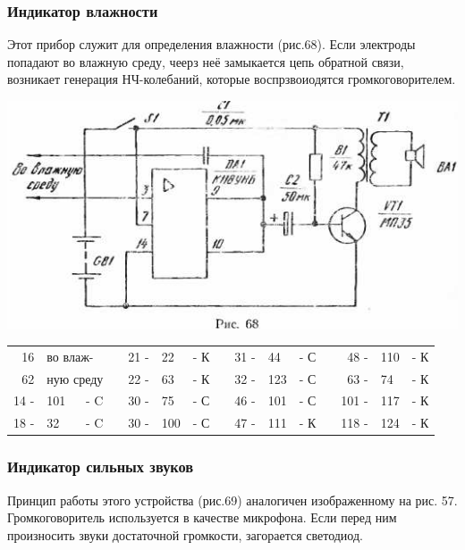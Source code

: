 \documentclass[12pt]{article}
\begin{document}
\newpage

\subsubsection{Индикатор влажности}

Этот прибор служит для определения влажности (рис.68). Если электроды попадают во влажную среду, чеерз неё замыкается цепь обратной связи, возникает генерация НЧ-колебаний, которые воспрзвоиодятся громкоговорителем.

\includegraphics[scale=1, angle=-0.5]{ekon3_068_1}

\hrulefill

\begin{tabular}{r l r p{0.5cm} r l r p{0.5cm} r l r p{0.5cm} r l r}
16   & \multicolumn{2}{l}{ во влаж-} &   & 21 - &  22 & - К &   &  31 - &  44 & - С &   &  48 - & 110  & - К\\
62   & \multicolumn{2}{l}{ную среду} &   & 22 - &  63 & - К &   &  32 - & 123 & - С &   &  63 - &  74  & - К\\
14 - & 101 & - C                     &   & 30 - &  75 & - С &   &  46 - & 101 & - С &   & 101 - & 117  & - К\\
18 - &  32 & - C                     &   & 30 - & 100 & - С &   &  47 - & 111 & - К &   & 118 - & 124  & - К\\
\end{tabular}

\hrulefill

\subsubsection{ Индикатор сильных звуков}

Принцип работы этого устройства (рис.69) аналогичен изображенному на рис. 57. Громкоговоритель используется в качестве микрофона. Если перед ним произносить звуки достаточной громкости, загорается светодиод.
\end{document}
